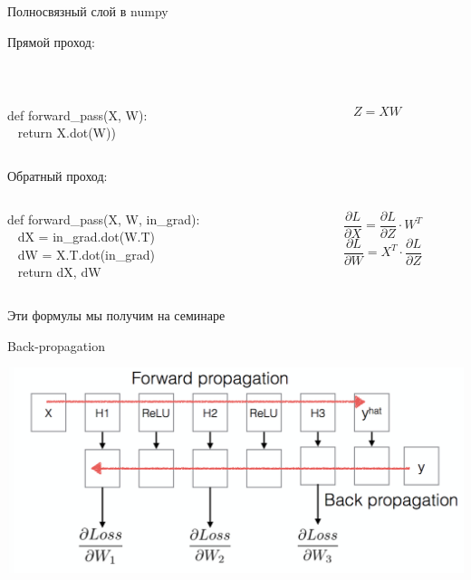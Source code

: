 \documentclass[notes,12pt, aspectratio=169]{beamer}
\begin{document}
\begin{frame}[fragile]{Полносвязный слой в numpy}

\alert{Прямой проход:} 

\mbox{  }

\begin{columns}
\begin{column}{.49\textwidth}
{\color{green} def}  {\color{blue} forward\_pass}(X, W):  \\
\mbox{ } \hspace{5mm} {\color{green} return } X.dot(W))
\end{column}
\begin{column}{.49\textwidth}
\[ Z = XW \]
\end{column}
\end{columns}

\vfill 

\alert{Обратный проход:}

\begin{columns}
\begin{column}{.49\textwidth}
{\color{green} def}  {\color{blue} forward\_pass}(X, W, in\_grad):  \\
\mbox{ } \hspace{5mm} dX = in\_grad.dot(W.T) \\
\mbox{ } \hspace{5mm} dW = X.T.dot(in\_grad) \\
\mbox{ } \hspace{5mm} {\color{green} return } dX, dW
\end{column}
\begin{column}{.49\textwidth}

\[  \frac{\partial L}{\partial X}  =   \frac{\partial L}{\partial Z} \cdot W^T \]
\[ \frac{\partial L}{\partial W}  =  X^T \cdot \frac{\partial L}{\partial Z} \]
\end{column}
\end{columns}
\begin{center}
	\alert{Эти формулы мы получим на семинаре}
\end{center}
\end{frame}


\begin{frame}{Back-propagation}
\begin{center}
	\includegraphics[width=.8\linewidth]{backpropagation.png}
\end{center}
\end{frame}
\end{document}

